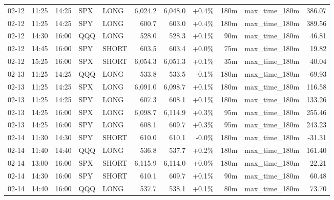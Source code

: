 \documentclass[11pt,a4paper,twoside]{article}
\begin{document}
\begin{center}
\begin{longtable}{>{\color{txtmain}}l l l l l r r r r >{\color{txtmain}}l r}
02-12 & 11:25 & 14:25 & SPX & LONG & 6,024.2 & 6,048.0 & \textcolor{wingreen}{+0.4\%} & 180m & max\_time\_180m & \textcolor{wingreen}{386.07} \\
02-12 & 11:25 & 14:25 & SPY & LONG & 600.7 & 603.0 & \textcolor{wingreen}{+0.4\%} & 180m & max\_time\_180m & \textcolor{wingreen}{389.56} \\
02-12 & 14:30 & 16:00 & QQQ & LONG & 528.0 & 528.3 & \textcolor{wingreen}{+0.1\%} & 90m & max\_time\_180m & \textcolor{wingreen}{46.81} \\
02-12 & 14:45 & 16:00 & SPY & SHORT & 603.5 & 603.4 & \textcolor{wingreen}{+0.0\%} & 75m & max\_time\_180m & \textcolor{wingreen}{19.82} \\
02-12 & 15:25 & 16:00 & SPX & SHORT & 6,054.3 & 6,051.3 & \textcolor{wingreen}{+0.1\%} & 35m & max\_time\_180m & \textcolor{wingreen}{40.04} \\
02-13 & 11:25 & 14:25 & QQQ & LONG & 533.8 & 533.5 & \textcolor{lossred}{-0.1\%} & 180m & max\_time\_180m & \textcolor{lossred}{-69.93} \\
02-13 & 11:25 & 14:25 & SPX & LONG & 6,091.0 & 6,098.7 & \textcolor{wingreen}{+0.1\%} & 180m & max\_time\_180m & \textcolor{wingreen}{116.58} \\
02-13 & 11:25 & 14:25 & SPY & LONG & 607.3 & 608.1 & \textcolor{wingreen}{+0.1\%} & 180m & max\_time\_180m & \textcolor{wingreen}{133.26} \\
02-13 & 14:25 & 16:00 & SPX & LONG & 6,098.7 & 6,114.9 & \textcolor{wingreen}{+0.3\%} & 95m & max\_time\_180m & \textcolor{wingreen}{255.46} \\
02-13 & 14:25 & 16:00 & SPY & LONG & 608.1 & 609.7 & \textcolor{wingreen}{+0.3\%} & 95m & max\_time\_180m & \textcolor{wingreen}{243.23} \\
02-14 & 11:30 & 14:30 & SPY & SHORT & 610.0 & 610.1 & \textcolor{lossred}{-0.0\%} & 180m & max\_time\_180m & \textcolor{lossred}{-31.31} \\
02-14 & 11:40 & 14:40 & QQQ & LONG & 536.8 & 537.7 & \textcolor{wingreen}{+0.2\%} & 180m & max\_time\_180m & \textcolor{wingreen}{161.40} \\
02-14 & 13:00 & 16:00 & SPX & SHORT & 6,115.9 & 6,114.0 & \textcolor{wingreen}{+0.0\%} & 180m & max\_time\_180m & \textcolor{wingreen}{22.21} \\
02-14 & 14:30 & 16:00 & SPY & SHORT & 610.1 & 609.7 & \textcolor{wingreen}{+0.1\%} & 90m & max\_time\_180m & \textcolor{wingreen}{60.48} \\
02-14 & 14:40 & 16:00 & QQQ & LONG & 537.7 & 538.1 & \textcolor{wingreen}{+0.1\%} & 80m & max\_time\_180m & \textcolor{wingreen}{73.70} \\

\end{longtable}
\end{center}
\end{document}
